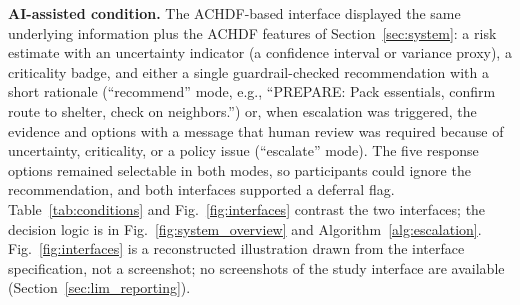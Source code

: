 \documentclass[journal]{IEEEtran}
\theoremstyle{plain}
\theoremstyle{definition}
\begin{document}
    \textbf{AI-assisted condition.} The ACHDF-based interface displayed the same underlying information plus the ACHDF features of Section~\ref{sec:system}: a risk estimate with an uncertainty indicator (a confidence interval or variance proxy), a criticality badge, and either a single guardrail-checked recommendation with a short rationale (``recommend'' mode, e.g., ``PREPARE: Pack essentials, confirm route to shelter, check on neighbors.'') or, when escalation was triggered, the evidence and options with a message that human review was required because of uncertainty, criticality, or a policy issue (``escalate'' mode). The five response options remained selectable in both modes, so participants could ignore the recommendation, and both interfaces supported a deferral flag. Table~\ref{tab:conditions} and Fig.~\ref{fig:interfaces} contrast the two interfaces; the decision logic is in Fig.~\ref{fig:system_overview} and Algorithm~\ref{alg:escalation}. Fig.~\ref{fig:interfaces} is a reconstructed illustration drawn from the interface specification, not a screenshot; no screenshots of the study interface are available (Section~\ref{sec:lim_reporting}).
\end{document}
